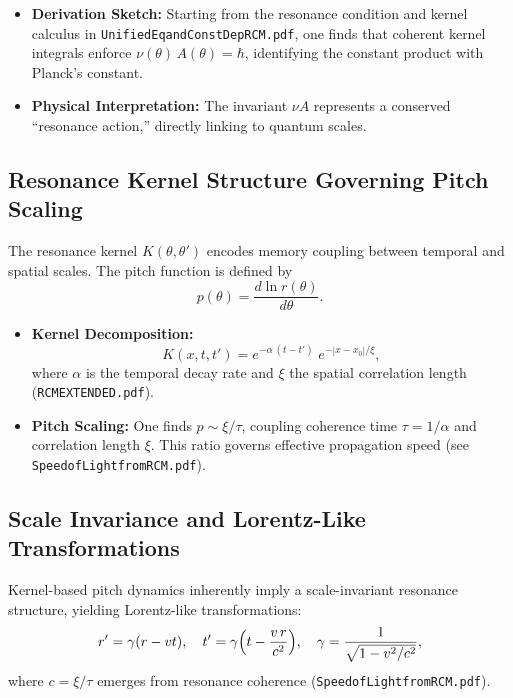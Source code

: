 \begin{itemize}
  \item \textbf{Derivation Sketch:}  
    Starting from the resonance condition and kernel calculus in \texttt{UnifiedEqandConstDepRCM.pdf}, one finds that coherent kernel integrals enforce
    \(\nu(\theta)\,A(\theta)=\hbar\), identifying the constant product with Planck’s constant.
  \item \textbf{Physical Interpretation:}  
    The invariant \(\nu A\) represents a conserved “resonance action,” directly linking to quantum scales.
\end{itemize}

\subsection{Resonance Kernel Structure Governing Pitch Scaling}
\label{sec:kernel-pitch}

The resonance kernel \(K(\theta,\theta')\) encodes memory coupling between temporal and spatial scales.  The pitch function is defined by
\begin{equation}
  p(\theta) = \frac{d \ln r(\theta)}{d\theta}.
\end{equation}

\begin{itemize}
  \item \textbf{Kernel Decomposition:}  
    \[
      K(x,t,t') = e^{-\alpha\,(t - t')}\; e^{-|x - x_0|/\xi},
    \]
    where \(\alpha\) is the temporal decay rate and \(\xi\) the spatial correlation length (\texttt{RCMEXTENDED.pdf}).
  \item \textbf{Pitch Scaling:}  
    One finds \(p\sim \xi/\tau\), coupling coherence time \(\tau=1/\alpha\) and correlation length \(\xi\).  This ratio governs effective propagation speed (see \texttt{SpeedofLightfromRCM.pdf}).
\end{itemize}

\subsection{Scale Invariance and Lorentz-Like Transformations}
\label{sec:lorentz-from-pitch}

Kernel-based pitch dynamics inherently imply a scale-invariant resonance structure, yielding Lorentz-like transformations:
\begin{equation}
  r' = \gamma(r - v t), 
  \quad
  t' = \gamma\Bigl(t - \frac{v\,r}{c^2}\Bigr),
  \quad
  \gamma = \frac{1}{\sqrt{1 - v^2/c^2}},
\end{equation}
where \(c=\xi/\tau\) emerges from resonance coherence (\texttt{SpeedofLightfromRCM.pdf}).

